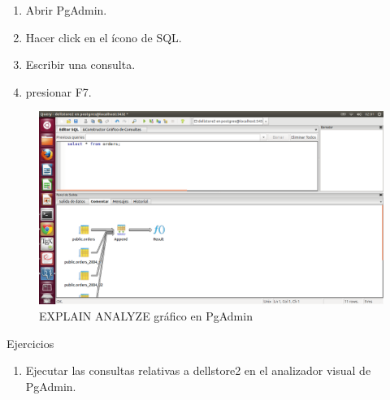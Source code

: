 \begin{enumerate}
\item Abrir PgAdmin.
\item Hacer click en el ícono de SQL.
\item Escribir una consulta.
\item presionar F7.
\end{enumerate}

\begin{figure}[ht!]
   \centering
   \includegraphics[scale=0.3]{imagenes/analyze_grafico_pgadmin.png}
   \caption{EXPLAIN ANALYZE gráfico en PgAdmin}\label{graf:analyze-grafico}
\end{figure}



\newpage

Ejercicios

\begin{enumerate}
\item Ejecutar las consultas relativas a dellstore2 en el analizador visual de PgAdmin.
\end{enumerate}
